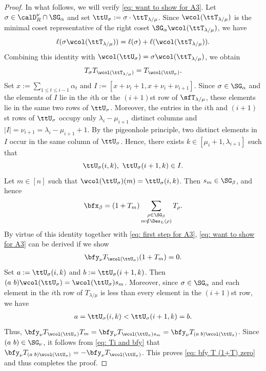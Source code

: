 \documentclass[12pt, reqno]{amsart}
\theoremstyle{plain}
\theoremstyle{definition}
\numberwithin{equation}{section}
\numberwithin{figure}{section}
\numberwithin{table}{section}
\begin{document}
\begin{proof}
In what follows, we will verify \cref{eq: want to show for A3}.
Let $\sigma \in \calD_R^\nu \cap \SG_\alpha$ and
set $\ttU_{\sigma} := \sigma \cdot \ttT_{\lambda/\mu}$.
Since $\wcol(\ttT_{\lambda/\mu})$ is the minimal  coset representative of the right coset $\SG_{\alpha} \wcol(\ttT_{\lambda/\mu})$, we have
\[
\ell(\sigma \wcol(\ttT_{\lambda/\mu})) =  \ell(\sigma) + \ell(\wcol(\ttT_{\lambda/\mu})).
\]
Combining this identity with  $\wcol(\ttU_\sigma) = \sigma \wcol(\ttT_{\lambda/\mu})$, we obtain
\begin{align}\label{eq: first step for A3}
T_{\sigma} T_{\wcol(\ttT_{\lambda/\mu})} = T_{\wcol(\ttU_\sigma)}.
\end{align}
Set $x := \sum_{1 \leq t \leq i-1} \alpha_t$ and $I := [x+\nu_i +1,x+\nu_i+\nu_{i+1}]$.
Since $\sigma \in \SG_{\alpha}$ and the elements of $I$ lie in the $i$th or the $(i+1)$st row of $\sfT_{\lambda/\mu}$, these elements lie in the same two rows of $\ttU_{\sigma}$.
Moreover, the entries in the $i$th and $(i+1)$st rows of $\ttU_\sigma$ occupy only $\lambda_i-\mu_{i+1}$ distinct columns and $|I|=\nu_{i+1}=\lambda_i-\mu_{i+1}+1$.
By the pigeonhole principle, two distinct elements in $I$ occur in the same column of $\ttU_\sigma$.
Hence, there exists $k \in [\mu_i+1, \lambda_{i+1}]$ such that
\[
\ttU_\sigma(i,k),\ \ttU_\sigma(i+1,k)\in I.
\]
Let $m \in [n]$ such that $\wcol(\ttU_\sigma)(m) = \ttU_\sigma(i, k)$.
Then $s_m \in \SG_\beta$, and hence 
\[
\bfx_{\beta} = (1+T_m) \sum_{\substack{\rho \in \SG_{\beta}\\m \notin \Des_L(\rho)}} T_{\rho}.
\] 
By virtue of this identity together with  \cref{eq: first step for A3}, \cref{eq: want to show for A3} can be derived if we show
\begin{align}\label{eq: bfy T (1+T) zero}
\bfy_\nu T_{\wcol(\ttU_\sigma)}(1+T_m)=0.
\end{align}
Set $a := \ttU_{\sigma}(i, k)$ and  $b := \ttU_{\sigma}(i+1, k)$.
Then $(a \  b) \wcol(\ttU_{\sigma}) = \wcol(\ttU_\sigma) s_m$.
Moreover, since $\sigma \in \SG_{\alpha}$ and each element in the $i$th row of $T_{\lambda/\mu}$ is less than every element in the $(i+1)$st row, we have
\begin{align*}
a = \ttU_{\sigma}(i, k) < \ttU_{\sigma}(i+1, k) = b.   
\end{align*}
Thus,
$\bfy_\nu T_{\wcol(\ttU_\sigma)} T_m = \bfy_{\nu} T_{\wcol(\ttU_{\sigma}) s_m} = \bfy_{\nu} T_{(a \; b)\wcol(\ttU_{\sigma})}$.
Since $(a \  b) \in \SG_{\nu}$, it follows from \cref{eq: Ti and bfy} that $\bfy_{\nu} T_{(a \;  b)\wcol(\ttU_{\sigma})} = -\bfy_{\nu} T_{\wcol(\ttU_{\sigma})}$.
This proves \cref{eq: bfy T (1+T) zero} and thus completes the proof.
\end{proof}
\end{document}
